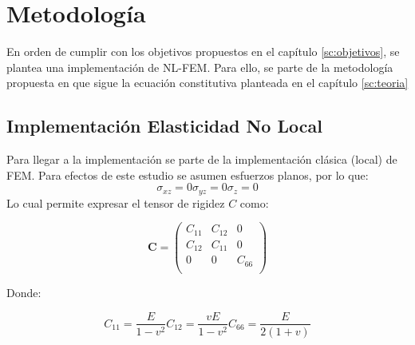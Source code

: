 \section{Metodología}
\label{sc:metodos}
	En orden de cumplir con los objetivos propuestos en el capítulo \ref{sc:objetivos}, se plantea una implementación de NL-FEM. Para ello, se parte de la metodología propuesta en \textit{} \parencite{Pisano2009} que sigue la ecuación constitutiva planteada en el capítulo \ref{sc:teoria}
	\subsection{Implementación Elasticidad No Local}
	\label{sub:implementación}
	Para llegar a la implementación se parte de la implementación clásica (local) de FEM. Para efectos de este estudio se asumen esfuerzos planos, por lo que:
	\begin{subequations}
		\begin{equation}
			\sigma_{xz}=0
		\end{equation}
		\begin{equation}
			\sigma_{yz}=0
		\end{equation}
		\begin{equation}
			\sigma_{z}=0
		\end{equation}
	\end{subequations}
	Lo cual permite expresar el tensor de rigidez $C$ como:

	\begin{equation}
	\boldsymbol{C}=
		\begin{pmatrix}
			C_{11} & C_{12} & 0\\
			C_{12} & C_{11} & 0\\
			0 & 0 & C_{66}\\
		\end{pmatrix}
	\end{equation}

	Donde:

	\begin{subequations}
		\begin{equation}
			C_{11}=\frac{E}{1-v^2}
		\end{equation}
		\begin{equation}
			C_{12}=\frac{vE}{1-v^2}
		\end{equation}
		\begin{equation}
			C_{66}=\frac{E}{2(1+v)}
		\end{equation}
	\end{subequations}

